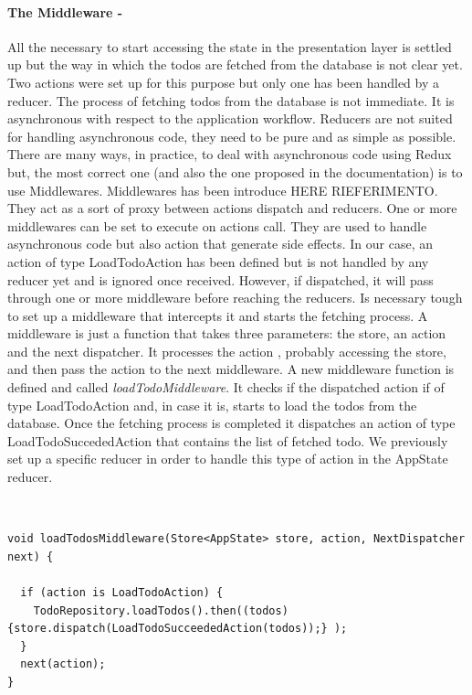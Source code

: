 \paragraph{The Middleware - }
\label{subpar:todo_app_bloc_core_state}
All the necessary to start accessing the state in the presentation layer is settled up but the way in which the todos are fetched from the database is not clear yet. Two actions were set up for this purpose but only one has been handled by a reducer. The process of fetching todos from the database is not immediate. It is asynchronous with respect to the application workflow. Reducers are not suited for handling asynchronous code, they need to be pure and as simple as possible. There are many ways, in practice, to deal with asynchronous code using Redux  but, the most correct one (and also the one proposed in the documentation) is to use Middlewares. Middlewares has been introduce HERE RIEFERIMENTO. They act as a sort of proxy between actions dispatch and reducers. One or more middlewares can be set to execute on actions call. They are used to handle asynchronous code but also action that generate side effects. In our case, an action of type LoadTodoAction has been defined but is not handled by any reducer yet and is ignored once received. However, if dispatched, it will pass through one or more middleware before reaching the reducers. Is necessary tough to set up a middleware that intercepts it and starts the fetching process. A middleware is just a function that takes three parameters: the store, an action and the next dispatcher. It processes the action , probably accessing the store, and then pass the action to the next middleware. A new middleware function is defined and called \textit{loadTodoMiddleware}. It  checks if the dispatched action if of type LoadTodoAction and, in case it is, starts to load the todos from the database. Once the fetching process is completed it dispatches an action of type LoadTodoSuccededAction that contains the list of fetched todo. We previously set up a specific reducer in order to handle this type of action in the AppState reducer.
\begin{code}
\mbox{}\\
 \mbox{}
		\label{code:2.14}
\begin{verbatim}
void loadTodosMiddleware(Store<AppState> store, action, NextDispatcher next) {

  if (action is LoadTodoAction) {
    TodoRepository.loadTodos().then((todos) {store.dispatch(LoadTodoSucceededAction(todos));} );
  }
  next(action);
}
\end{verbatim}
\mbox{}
\end{code}


